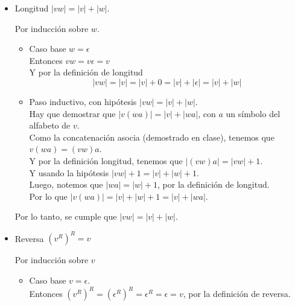 \documentclass{article}
\begin{document}
\begin{enumerate}
{\begin{itemize}
            \item {
                Longitud $|vw| = |v| + |w|$.

                Por inducción sobre $w$.

                \begin{itemize}
                    \item {
                        Caso base $w = \epsilon$\\
                        Entonces $vw = v\epsilon = v$\\
                        Y por la definición de longitud
                        \[|vw| = |v| = |v| + 0 = |v| + |\epsilon| = |v| + |w|\]
                    }

                    \item {
                        Paso inductivo, con hipótesis $|vw| = |v| + |w|$.\\ 
                        Hay que demostrar que $|v(wa)| = |v| + |wa|$, con $a$ 
                        un símbolo del alfabeto de $v$.\\
                        Como la concatenación asocia (demostrado en clase), 
                        tenemos que $v(wa) = (vw)a$.\\
                        Y por la definición longitud, tenemos que
                        $|(vw)a| = |vw| + 1$.\\
                        Y usando la hipótesis $|vw| + 1 = |v| + |w| + 1$.\\
                        Luego, notemos que $|wa| = |w| + 1$, por la definición de longitud.\\
                        Por lo que $|v(wa)| = |v| + |w| + 1 = |v| + |wa|$.
                    }
                \end{itemize}
                Por lo tanto, se cumple que $|vw| = |v| + |w|$.
            }

            \item {
                Reversa $(v^R)^R = v$

                Por inducción sobre $v$
                \begin{itemize}
                    \item {
                        Caso base $v = \epsilon$.\\
                        Entonces $(v^R)^R = (\epsilon^R)^R = \epsilon ^ R = 
                        \epsilon = v$, por la definición de reversa.       
                    }


\end{itemize}}
\end{itemize}}
\end{enumerate}
\end{document}
